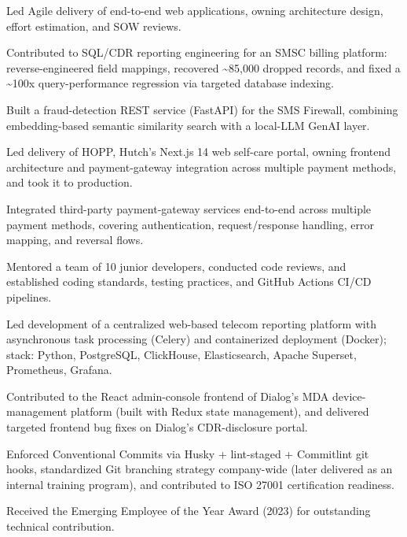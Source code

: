 \documentclass[10.5pt]{article}
\begin{document}
\begin{cvitems}
  \item Led Agile delivery of end-to-end web applications, owning architecture design, effort estimation, and SOW reviews.
  \item Contributed to SQL/CDR reporting engineering for an SMSC billing platform: reverse-engineered field mappings, recovered \textasciitilde85,000 dropped records, and fixed a \textasciitilde100x query-performance regression via targeted database indexing.
  \item Built a fraud-detection REST service (FastAPI) for the SMS Firewall, combining embedding-based semantic similarity search with a local-LLM GenAI layer.
  \item Led delivery of HOPP, Hutch's Next.js 14 web self-care portal, owning frontend architecture and payment-gateway integration across multiple payment methods, and took it to production.
  \item Integrated third-party payment-gateway services end-to-end across multiple payment methods, covering authentication, request/response handling, error mapping, and reversal flows.
  \item Mentored a team of 10 junior developers, conducted code reviews, and established coding standards, testing practices, and GitHub Actions CI/CD pipelines.
\end{cvitems}

\begin{cvitems}
  \item Led development of a centralized web-based telecom reporting platform with asynchronous task processing (Celery) and containerized deployment (Docker); stack: Python, PostgreSQL, ClickHouse, Elasticsearch, Apache Superset, Prometheus, Grafana.
  \item Contributed to the React admin-console frontend of Dialog's MDA device-management platform (built with Redux state management), and delivered targeted frontend bug fixes on Dialog's CDR-disclosure portal.
  \item Enforced Conventional Commits via Husky + lint-staged + Commitlint git hooks, standardized Git branching strategy company-wide (later delivered as an internal training program), and contributed to ISO 27001 certification readiness.
  \item Received the Emerging Employee of the Year Award (2023) for outstanding technical contribution.
\end{cvitems}
\end{document}
